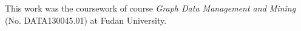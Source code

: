 \documentclass[sigconf, nonacm]{acmart}
\begin{document}


 



\begin{acks}
This work was the coursework of course \emph{Graph Data Management and Mining} (No. DATA130045.01) at Fudan University.
\end{acks}



%

\end{document}
